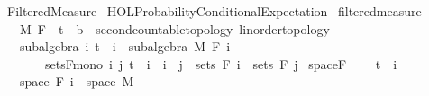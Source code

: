 %
\begin{isabellebody}%
%
%
\isadelimtheory
%
\endisadelimtheory
%
\isatagtheory
{}\isamarkupfalse%
\ Filtered{\isacharunderscore}{\kern0pt}Measure\isanewline
{}\ {\isachardoublequoteopen}HOL{\isacharminus}{\kern0pt}Probability{\isachardot}{\kern0pt}Conditional{\isacharunderscore}{\kern0pt}Expectation{\isachardoublequoteclose}\isanewline
{}%
\endisatagtheory
{\isafoldtheory}%
%
\isadelimtheory
%
\endisadelimtheory
%
\isadelimdocument
%
\endisadelimdocument
%
\isatagdocument
%
\isamarkuptrue%
%
\isamarkuptrue%
%
\endisatagdocument
{\isafolddocument}%
%
\isadelimdocument
%
\endisadelimdocument
{}\isamarkupfalse%
\ filtered{\isacharunderscore}{\kern0pt}measure\ {\isacharequal}{\kern0pt}\ \isanewline
\ \ \ M\ F\ \ t\ {\isacharcolon}{\kern0pt}{\isacharcolon}{\kern0pt}\ {\isachardoublequoteopen}{\isacharprime}{\kern0pt}b\ {\isacharcolon}{\kern0pt}{\isacharcolon}{\kern0pt}\ {\isacharbraceleft}{\kern0pt}second{\isacharunderscore}{\kern0pt}countable{\isacharunderscore}{\kern0pt}topology{\isacharcomma}{\kern0pt}\ linorder{\isacharunderscore}{\kern0pt}topology{\isacharbraceright}{\kern0pt}{\isachardoublequoteclose}\isanewline
\ \ \ subalgebra{\isacharcolon}{\kern0pt}\ {\isachardoublequoteopen}{\isasymAnd}i{\isachardot}{\kern0pt}\ t\ {\isasymle}\ i\ {\isasymLongrightarrow}\ subalgebra\ M\ {\isacharparenleft}{\kern0pt}F\ i{\isacharparenright}{\kern0pt}{\isachardoublequoteclose}\isanewline
\ \ \ \ \ \ \ sets{\isacharunderscore}{\kern0pt}F{\isacharunderscore}{\kern0pt}mono{\isacharcolon}{\kern0pt}\ {\isachardoublequoteopen}{\isasymAnd}i\ j{\isachardot}{\kern0pt}\ t\ {\isasymle}\ i\ {\isasymLongrightarrow}\ i\ {\isasymle}\ j\ {\isasymLongrightarrow}\ sets\ {\isacharparenleft}{\kern0pt}F\ i{\isacharparenright}{\kern0pt}\ {\isasymle}\ sets\ {\isacharparenleft}{\kern0pt}F\ j{\isacharparenright}{\kern0pt}{\isachardoublequoteclose}\isanewline
{}\isanewline
\isanewline
{}\isamarkupfalse%
\ space{\isacharunderscore}{\kern0pt}F{\isacharcolon}{\kern0pt}\ \isanewline
\ \ \ {\isachardoublequoteopen}t\ {\isasymle}\ i{\isachardoublequoteclose}\isanewline
\ \ \ {\isachardoublequoteopen}space\ {\isacharparenleft}{\kern0pt}F\ i{\isacharparenright}{\kern0pt}\ {\isacharequal}{\kern0pt}\ space\ M{\isachardoublequoteclose}\isanewline

\end{isabellebody}

